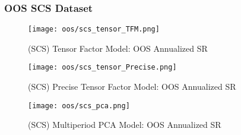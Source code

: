\subsubsection{OOS SCS Dataset}

\begin{figure}[H]
    \centering
    \texttt{[image: oos/scs\_tensor\_TFM.png]}
    \caption{(SCS) Tensor Factor Model: OOS Annualized SR}
    \label{fig:scs-oos-tfm}
\end{figure}

\begin{figure}[H]
    \centering
    \texttt{[image: oos/scs\_tensor\_Precise.png]}
    \caption{(SCS) Precise Tensor Factor Model: OOS Annualized SR}
    \label{fig:scs-oos-precise}
\end{figure}


\begin{figure}[H]
    \centering
    \texttt{[image: oos/scs\_pca.png]}
    \caption{(SCS) Multiperiod PCA Model: OOS Annualized SR}
    \label{fig:scs-oos-pca}
\end{figure}

